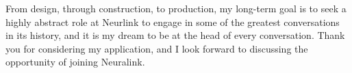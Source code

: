 \documentclass[11pt,a4paper,sans]{moderncv}        %
\begin{document}
From design, through construction, to production, my long-term goal is to seek a highly abstract role at Neurlink to engage in some of the greatest conversations in its history, and it is my dream to be at the head of every conversation. Thank you for considering my application, and I look forward to discussing the opportunity of joining Neuralink.


\makeletterclosing
\end{document}
